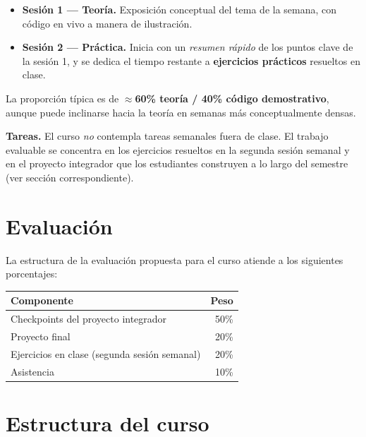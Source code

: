 \documentclass[11pt,letterpaper]{article}
\newcommand{\blue}[1]{{\color{cerulean}#1}}
\newcommand{\orange}[1]{{\color{redorange}#1}}
\begin{document}
\begin{itemize}[leftmargin=*]
    \item \textbf{\blue{Sesión 1 --- Teoría.}} Exposición conceptual del tema de la semana, con código en vivo a manera de ilustración. 
    \item \textbf{\orange{Sesión 2 --- Práctica.}} Inicia con un \textit{resumen rápido} de los puntos clave de la sesión 1, y se dedica el tiempo restante a \textbf{ejercicios prácticos} resueltos en clase.
\end{itemize}

La proporción típica es de \textbf{$\approx$60\% teoría / 40\% código demostrativo}, aunque puede inclinarse hacia la teoría en semanas más conceptualmente densas.

\textbf{Tareas.} El curso \textit{no} contempla tareas semanales fuera de clase. El trabajo evaluable se concentra en los ejercicios resueltos en la segunda sesión semanal y en el \orange{proyecto integrador} que los estudiantes construyen a lo largo del semestre (ver sección correspondiente).

\section{Evaluación}

La estructura de la evaluación propuesta para el curso atiende a los siguientes porcentajes:

\begin{center}
\begin{tabular}{lr}
\toprule
\textbf{Componente} & \textbf{Peso} \\
\midrule
Checkpoints del proyecto integrador       & 50\% \\
Proyecto final                            & 20\% \\
Ejercicios en clase (segunda sesión semanal)    & 20\% \\
Asistencia                                & 10\%  \\
\bottomrule
\end{tabular}
\end{center}

\section{Estructura del curso}
\end{document}
